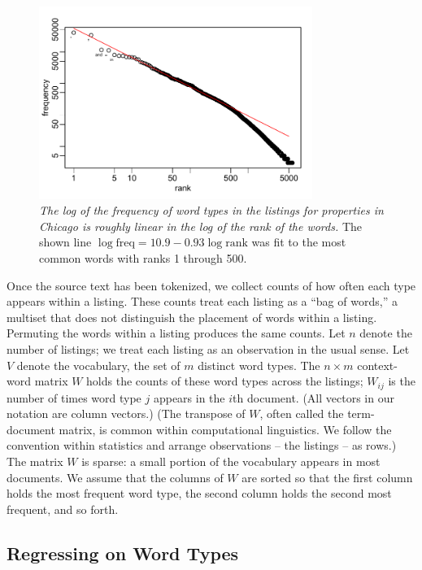 \documentclass[12pt]{article}
\begin{document}
 \begin{figure}
 \caption{ \label{fig:zipf} { \sl The log of the frequency of word types in the
 listings for properties in Chicago is roughly linear in the log of the rank of
 the words.}  The shown line $\log \mbox{freq} = 10.9 - 0.93 \log \mbox{rank}$ 
 was fit to the most common words with ranks 1 through 500.  }

 \centerline{
 \vspace{0.1in}
 \includegraphics[width=3.5in]{figures/zipf} }
 \vspace{0.2in}
 \end{figure}


 Once the source text has been tokenized, we collect counts of how often each
 type appears within a listing.  These counts treat each listing as a ``bag of
 words,'' a multiset that does not distinguish the placement of words within a
 listing.  Permuting the words within a listing  produces the same
 counts.  Let $n$ denote the number of listings; we treat each listing as an observation
 in the usual sense.  Let $V$ denote the vocabulary, the set of
 $m$ distinct word types.  The $n \times m$ context-word matrix $W$ holds the counts of  
 these word types across the listings; $W_{ij}$ is the number of times word type $j$
 appears in the $i$th document.  (All vectors in our notation are column
 vectors.)  (The transpose of $W$, often called the term-document matrix, is common
 within computational linguistics. We follow the convention within statistics
 and arrange observations -- the listings -- as rows.)  The matrix
 $W$ is sparse: a small portion of the vocabulary appears in most documents. We assume that the columns of $W$ are sorted so that the first column holds the most frequent word type, the second column holds the second most frequent, and so forth.


\subsection{ Regressing on Word Types }  %
\end{document}
